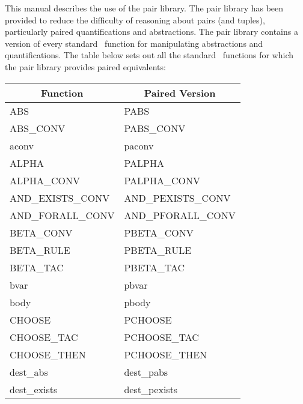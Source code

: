 This manual describes the use of the pair library.
The pair library has been provided to reduce the difficulty of reasoning
about pairs (and tuples), particularly paired quantifications and abstractions.
The pair library contains a version of every standard \HOL\ function
for manipulating abstractions and quantifications.
The table below sets out all the standard \HOL\ functions for which the
pair library provides paired equivalents:
{\tiny \begin{center}
    \begin{tabular}[t]{|l|l|}                                           \hline
        \multicolumn{1}{|c|}{\normalsize Function}
    &   \multicolumn{1}{|c|}{\normalsize Paired Version}\\              \hline
        ABS                         &   PABS                        \\
        ABS\_CONV                   &   PABS\_CONV                  \\
        aconv                       &   paconv                      \\
        ALPHA                       &   PALPHA                      \\
        ALPHA\_CONV                 &   PALPHA\_CONV                \\
        AND\_EXISTS\_CONV           &   AND\_PEXISTS\_CONV          \\
        AND\_FORALL\_CONV           &   AND\_PFORALL\_CONV          \\
        BETA\_CONV                  &   PBETA\_CONV                 \\
        BETA\_RULE                  &   PBETA\_RULE                 \\
        BETA\_TAC                   &   PBETA\_TAC                  \\
        bvar                        &   pbvar                       \\
        body                        &   pbody                       \\
        CHOOSE                      &   PCHOOSE                     \\
        CHOOSE\_TAC                 &   PCHOOSE\_TAC                \\
        CHOOSE\_THEN                &   PCHOOSE\_THEN               \\
        dest\_abs                   &   dest\_pabs                  \\
        dest\_exists                &   dest\_pexists               \\

\end{tabular}
\end{center}}
